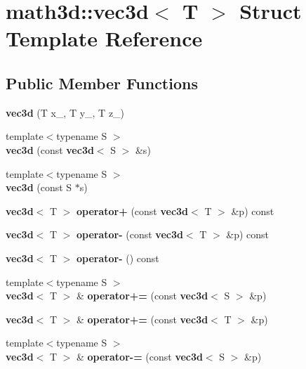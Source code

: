\section{math3d\-:\-:vec3d$<$ T $>$ Struct Template Reference}
\label{structmath3d_1_1vec3d}
\subsection*{Public Member Functions}
\begin{DoxyCompactItemize}
\item 
{\bfseries vec3d} (T x\-\_\-, T y\-\_\-, T z\-\_\-)\label{structmath3d_1_1vec3d_a54f1c54162b7a8c1430145a4d71cbfbc}

\item 
{\footnotesize template$<$typename S $>$ }\\{\bfseries vec3d} (const {\bf vec3d}$<$ S $>$ \&s)\label{structmath3d_1_1vec3d_a9e9785b3bbc5014e9bc39a430fc3e44f}

\item 
{\footnotesize template$<$typename S $>$ }\\{\bfseries vec3d} (const S $\ast$s)\label{structmath3d_1_1vec3d_a76d9267dcd3be29de7d2c239f1fc012f}

\item 
{\bf vec3d}$<$ T $>$ {\bfseries operator+} (const {\bf vec3d}$<$ T $>$ \&p) const \label{structmath3d_1_1vec3d_a3486ba253eade9216eb318ef64b11814}

\item 
{\bf vec3d}$<$ T $>$ {\bfseries operator-\/} (const {\bf vec3d}$<$ T $>$ \&p) const \label{structmath3d_1_1vec3d_a47d638c94df8092cd45a2a6c5d7eff5c}

\item 
{\bf vec3d}$<$ T $>$ {\bfseries operator-\/} () const \label{structmath3d_1_1vec3d_ab6a261325cb8ef01b740fac604399793}

\item 
{\footnotesize template$<$typename S $>$ }\\{\bf vec3d}$<$ T $>$ \& {\bfseries operator+=} (const {\bf vec3d}$<$ S $>$ \&p)\label{structmath3d_1_1vec3d_a07ec0bcbb17af08c89969789448c4b1a}

\item 
{\bf vec3d}$<$ T $>$ \& {\bfseries operator+=} (const {\bf vec3d}$<$ T $>$ \&p)\label{structmath3d_1_1vec3d_aa2eaa811441797b45201c693d784ee5a}

\item 
{\footnotesize template$<$typename S $>$ }\\{\bf vec3d}$<$ T $>$ \& {\bfseries operator-\/=} (const {\bf vec3d}$<$ S $>$ \&p)\label{structmath3d_1_1vec3d_a33456a8c2d6aaac5f5a87e20b1defcb4}


\end{DoxyCompactItemize}
